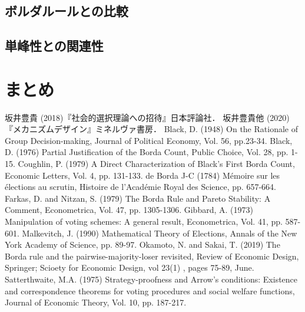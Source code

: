 \documentclass[dvipdfmx]{jsarticle}
\begin{document}
\subsection{ボルダルールとの比較}
\subsection{単峰性との関連性}

\section{まとめ}

\begin{thebibliography}{9}
  坂井豊貴 (2018)『社会的選択理論への招待』日本評論社．
  坂井豊貴他 (2020)『メカニズムデザイン』ミネルヴァ書房．
  Black, D. (1948) On the Rationale of Group Decision-making, Journal of Political Economy,
  Vol. 56, pp.23-34.
  Black, D. (1976) Partial Justification of the Borda Count, Public Choice,
  Vol. 28, pp. 1-15.
  Coughlin, P. (1979) A Direct Characterization of Black's First Borda Count,
  Economic Letters, Vol. 4, pp. 131-133.
  de Borda J-C (1784) M\'{e}moire sur les \'{e}lections au scrutin, Histoire de l'Acad\'{e}mie
  Royal des Science, pp. 657-664.
  Farkas, D. and Nitzan, S. (1979) The Borda Rule and Pareto Stability: A Comment,
  Econometrica, Vol. 47, pp. 1305-1306.
  Gibbard, A. (1973) Manipulation of voting schemes: A general result, Econometrica, Vol. 41,
  pp. 587-601.
    Malkevitch, J. (1990) Mathematical Theory of Elections, Annals of the New York
    Academy of Science, pp. 89-97.
  Okamoto, N. and Sakai, T. (2019) The Borda rule and the pairwise-majority-loser
  revisited, Review of Economic Design, Springer; Scioety for Economic Design, vol 23(1)
  , pages 75-89, June.
  Satterthwaite, M.A. (1975) Strategy-proofness and Arrow's conditions:
  Existence and correspondence theorems for voting procedures and social
  welfare functions, Journal of Economic Theory, Vol. 10, pp. 187-217.
\end{thebibliography}
\end{document}
